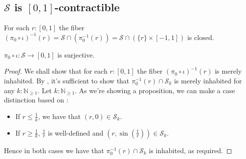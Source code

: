 

\subsection{$\mathcal S$ is $[0,1]$-contractible}\label{curveShape}
\begin{remark}
  For each $r:[0,1]$ the fiber
  $ (\pi_0\circ \iota)^{-1}(r) = \mathcal S \cap (\pi_0^{-1}(r)) =
  \mathcal S \cap (\{r\} \times [-1,1])$ is closed.%
\end{remark}


\begin{lemma}\label{fiberInhabited}
  $\pi_0\circ \iota : \mathcal S \to [0,1]$ is surjective.
\end{lemma}
\begin{proof}
  We shall show that for each $r:[0,1]$ the fiber $(\pi_0\circ \iota)^{-1}(r)$ is merely inhabited. 
%
  By , 
  it's sufficient to show that $\pi_0^{-1}(r) \cap \mathcal S_k$
  is merely inhabited for any $k:\mathbb N_{\geq1}$. 
%
  Let $k:\mathbb N_{\geq 1}$. 
  As we're showing a proposition, we can make a case distinction based on :
  \begin{itemize}
    \item If $r\leq \frac1k$, we have that $(r,0) \in \mathcal S_k$. 
    \item If $r\geq \frac1k$, $\frac1r$ is well-defined and 
      $(r,\sin(\frac1r)) \in \mathcal S_k$. 
  \end{itemize}
  Hence in both cases we have that $\pi_0^{-1}(r) \cap \mathcal S_k$ is inhabited, as required. 
\end{proof}

